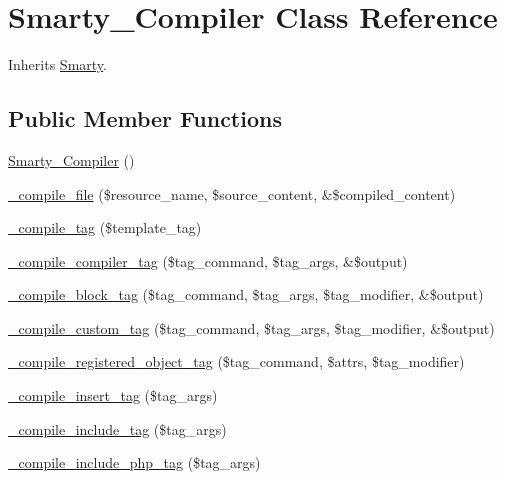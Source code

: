 \hypertarget{class_smarty___compiler}{}\section{Smarty\+\_\+\+Compiler Class Reference}
\label{class_smarty___compiler}


Inherits \mbox{\hyperlink{class_smarty}{Smarty}}.

\subsection*{Public Member Functions}
\begin{DoxyCompactItemize}
\item 
\mbox{\hyperlink{class_smarty___compiler_a7940bed7199f0d4c7c63d8a07a87bd8c}{Smarty\+\_\+\+Compiler}} ()
\item 
\mbox{\hyperlink{class_smarty___compiler_a00459be8de7cd5876714023939411f10}{\+\_\+compile\+\_\+file}} (\$resource\+\_\+name, \$source\+\_\+content, \&\$compiled\+\_\+content)
\item 
\mbox{\hyperlink{class_smarty___compiler_a2437ad0b38700c2b4b08573566c43c48}{\+\_\+compile\+\_\+tag}} (\$template\+\_\+tag)
\item 
\mbox{\hyperlink{class_smarty___compiler_aad3738a1a92e9a579dd3ab14469386b9}{\+\_\+compile\+\_\+compiler\+\_\+tag}} (\$tag\+\_\+command, \$tag\+\_\+args, \&\$output)
\item 
\mbox{\hyperlink{class_smarty___compiler_ade3e40923ed1ea61b8578831c2767a76}{\+\_\+compile\+\_\+block\+\_\+tag}} (\$tag\+\_\+command, \$tag\+\_\+args, \$tag\+\_\+modifier, \&\$output)
\item 
\mbox{\hyperlink{class_smarty___compiler_a4733e870ed01da5e62d52dde61cf2dec}{\+\_\+compile\+\_\+custom\+\_\+tag}} (\$tag\+\_\+command, \$tag\+\_\+args, \$tag\+\_\+modifier, \&\$output)
\item 
\mbox{\hyperlink{class_smarty___compiler_a4768af997ac7a6ca06b6f426b9bd39cf}{\+\_\+compile\+\_\+registered\+\_\+object\+\_\+tag}} (\$tag\+\_\+command, \$attrs, \$tag\+\_\+modifier)
\item 
\mbox{\hyperlink{class_smarty___compiler_a4a9b22720c848862c5719a116246955d}{\+\_\+compile\+\_\+insert\+\_\+tag}} (\$tag\+\_\+args)
\item 
\mbox{\hyperlink{class_smarty___compiler_a78d8b41387b488cf352e4a638023e5ed}{\+\_\+compile\+\_\+include\+\_\+tag}} (\$tag\+\_\+args)
\item 
\mbox{\hyperlink{class_smarty___compiler_a120c8620070c5417709f16896958c7bc}{\+\_\+compile\+\_\+include\+\_\+php\+\_\+tag}} (\$tag\+\_\+args)

\end{DoxyCompactItemize}
